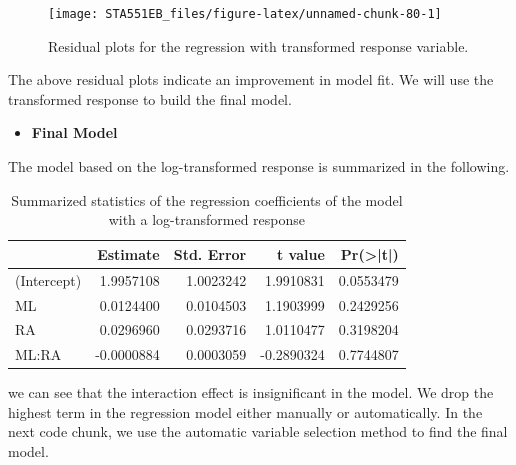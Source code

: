 \documentclass[
]{book}
\newenvironment{Shaded}{\begin{snugshade}}{\end{snugshade}}
\newcommand{\AttributeTok}[1]{\textcolor[rgb]{0.13,0.29,0.53}{#1}}
\newcommand{\FunctionTok}[1]{\textcolor[rgb]{0.13,0.29,0.53}{\textbf{#1}}}
\newcommand{\NormalTok}[1]{#1}
\newcommand{\SpecialCharTok}[1]{\textcolor[rgb]{0.81,0.36,0.00}{\textbf{#1}}}
\newcommand{\StringTok}[1]{\textcolor[rgb]{0.31,0.60,0.02}{#1}}
\providecommand{\tightlist}{%
  \setlength{\itemsep}{0pt}\setlength{\parskip}{0pt}}
\begin{document}
\begin{figure}

{\centering \texttt{[image: STA551EB\_files/figure-latex/unnamed-chunk-80-1]} 

}

\caption{Residual plots for the regression with transformed response variable.}\label{fig:unnamed-chunk-80}
\end{figure}

The above residual plots indicate an improvement in model fit. We will use the transformed response to build the final model.

\begin{itemize}
\tightlist
\item
  \textbf{Final Model}
\end{itemize}

The model based on the log-transformed response is summarized in the following.

\begin{Shaded}
\end{Shaded}

\begin{table}

\caption{\label{tab:unnamed-chunk-81}Summarized statistics of the regression 
      coefficients of the model with a log-transformed response}
\centering
\begin{tabular}[t]{l|r|r|r|r}
\hline
  & Estimate & Std. Error & t value & Pr(>|t|)\\
\hline
(Intercept) & 1.9957108 & 1.0023242 & 1.9910831 & 0.0553479\\
\hline
ML & 0.0124400 & 0.0104503 & 1.1903999 & 0.2429256\\
\hline
RA & 0.0296960 & 0.0293716 & 1.0110477 & 0.3198204\\
\hline
ML:RA & -0.0000884 & 0.0003059 & -0.2890324 & 0.7744807\\
\hline
\end{tabular}
\end{table}

we can see that the interaction effect is insignificant in the model. We drop the highest term in the regression model either manually or automatically. In the next code chunk, we use the automatic variable selection method to find the final model.
\end{document}
